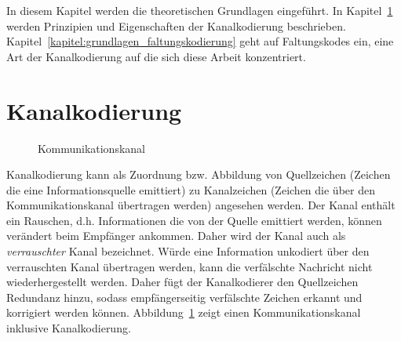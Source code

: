 In diesem Kapitel werden die theoretischen Grundlagen eingeführt. In Kapitel~\ref{kapitel:grundlagen_kanalkodierung} werden Prinzipien und Eigenschaften der Kanalkodierung beschrieben. Kapitel~\ref{kapitel:grundlagen_faltungskodierung} geht auf Faltungskodes ein, eine Art der Kanalkodierung auf die sich diese Arbeit konzentriert.
\section{Kanalkodierung}
\label{kapitel:grundlagen_kanalkodierung}
\begin{figure}[t]
\centering
\resizebox{\textwidth}{!}{%
	
}
\caption{Kommunikationskanal}
\label{abb:kommunikationskanal}
\end{figure}
Kanalkodierung kann als Zuordnung bzw. Abbildung von Quellzeichen (Zeichen die eine Informationsquelle emittiert) zu Kanalzeichen (Zeichen die über den Kommunikationskanal übertragen werden) angesehen werden. Der Kanal enthält ein Rauschen, d.h. Informationen die von der Quelle emittiert werden, können verändert beim Empfänger ankommen. Daher wird der Kanal auch als \emph{verrauschter} Kanal bezeichnet. Würde eine Information unkodiert über den verrauschten Kanal übertragen werden, kann die verfälschte Nachricht nicht wiederhergestellt werden. Daher fügt der Kanalkodierer den Quellzeichen Redundanz hinzu, sodass empfängerseitig verfälschte Zeichen erkannt und korrigiert werden können. Abbildung~\ref{abb:kommunikationskanal} zeigt einen Kommunikationskanal inklusive Kanalkodierung. 

